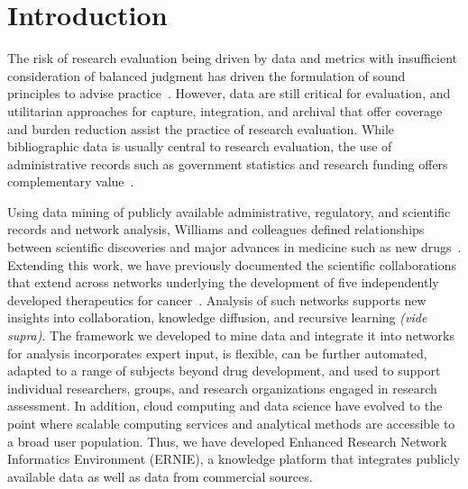 \documentclass[review]{elsarticle}
\begin{document}
\linenumbers
\raggedright

\section*{Introduction} 

The risk of research evaluation being driven by data and metrics with insufficient consideration of balanced judgment has driven the formulation of  sound principles to advise practice~\cite{LeidenManifesto2015}. However, data are still critical for evaluation, and utilitarian approaches for capture, integration, and archival that offer coverage and burden reduction assist the practice of research evaluation. While bibliographic data is usually central to research evaluation, the use of administrative records such as government statistics and research funding offers complementary value~\cite{FedStat2017}. 

Using data mining of publicly available administrative, regulatory, and scientific records and network analysis, Williams and colleagues defined relationships between scientific discoveries and major advances in medicine such as new drugs~\cite{Williams2015}. Extending this work, we have previously documented the scientific collaborations that extend across networks underlying the development of five independently developed therapeutics for cancer~\cite{Keserci2017}. Analysis of such networks supports new insights into collaboration, knowledge diffusion, and recursive learning \textit{(vide supra)}. The framework we developed to mine data and integrate it into networks for analysis incorporates expert input, is flexible, can be further automated, adapted to a range of subjects beyond drug development, and used to support individual researchers, groups, and research organizations engaged in research assessment. In addition, cloud computing and data science have evolved to the point where scalable computing services and analytical methods are accessible to a broad user population. Thus, we have developed Enhanced Research Network Informatics Environment (ERNIE), a knowledge platform that integrates publicly available data as well as data from commercial sources.  
\end{document}
